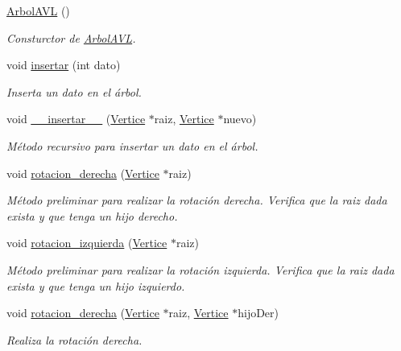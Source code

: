 \begin{DoxyCompactItemize}
\item 
\mbox{\label{classArbolAVL_afd1b81c0fb7bd76fc8b924f15ca7e926}} 
\hyperlink{classArbolAVL_afd1b81c0fb7bd76fc8b924f15ca7e926}{Arbol\+A\+VL} ()
\begin{DoxyCompactList}\small\item\em Consturctor de \hyperlink{classArbolAVL}{Arbol\+A\+VL}. \end{DoxyCompactList}\item 
void \hyperlink{classArbolAVL_a99512878bc14c77bf31ab7bf8dd6aa36}{insertar} (int dato)
\begin{DoxyCompactList}\small\item\em Inserta un dato en el árbol. \end{DoxyCompactList}\item 
void \hyperlink{classArbolAVL_ac88b4af2e6b96775793a981baba0763a}{\+\_\+\+\_\+insertar\+\_\+\+\_\+} (\hyperlink{classVertice}{Vertice} $\ast$raiz, \hyperlink{classVertice}{Vertice} $\ast$nuevo)
\begin{DoxyCompactList}\small\item\em Método recursivo para insertar un dato en el árbol. \end{DoxyCompactList}\item 
void \hyperlink{classArbolAVL_a498e8df16b6814ea1dad6bcdf274dc3f}{rotacion\+\_\+derecha} (\hyperlink{classVertice}{Vertice} $\ast$raiz)
\begin{DoxyCompactList}\small\item\em Método preliminar para realizar la rotación derecha. Verifica que la raiz dada exista y que tenga un hijo derecho. \end{DoxyCompactList}\item 
void \hyperlink{classArbolAVL_aedfb7658eb4f826aeba3fb98f50483e6}{rotacion\+\_\+izquierda} (\hyperlink{classVertice}{Vertice} $\ast$raiz)
\begin{DoxyCompactList}\small\item\em Método preliminar para realizar la rotación izquierda. Verifica que la raiz dada exista y que tenga un hijo izquierdo. \end{DoxyCompactList}\item 
void \hyperlink{classArbolAVL_a33dfba0b6e53caa0f2e4b71a8d2c6a7e}{rotacion\+\_\+derecha} (\hyperlink{classVertice}{Vertice} $\ast$raiz, \hyperlink{classVertice}{Vertice} $\ast$hijo\+Der)
\begin{DoxyCompactList}\small\item\em Realiza la rotación derecha. \end{DoxyCompactList}\item 

\end{DoxyCompactItemize}
